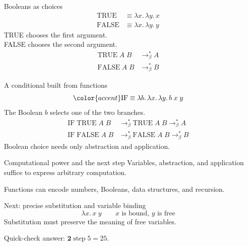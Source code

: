 \documentclass[aspectratio=169,11pt]{beamer}
\newcommand{\key}[1]{{\color{accent}#1}}
\begin{document}
\begin{frame}{Booleans as choices}
\begin{align*}
\mathrm{TRUE}&\equiv\lambda x.\,\lambda y.\,x\\[3mm]
\mathrm{FALSE}&\equiv\lambda x.\,\lambda y.\,y
\end{align*}
TRUE chooses the first argument.\\[2mm]
FALSE chooses the second argument.
\vspace{3mm}
\begin{align*}
\mathrm{TRUE}\;A\;B&\longrightarrow_{\beta}^{*}A\\
\mathrm{FALSE}\;A\;B&\longrightarrow_{\beta}^{*}B
\end{align*}
\end{frame}

\begin{frame}{A conditional built from functions}
\[\key{\mathrm{IF}\equiv\lambda b.\,\lambda x.\,\lambda y.\,b\;x\;y}\]
The Boolean $b$ selects one of the two branches.
\begin{align*}
\mathrm{IF}\;\mathrm{TRUE}\;A\;B
&\longrightarrow_{\beta}^{*}\mathrm{TRUE}\;A\;B
\longrightarrow_{\beta}^{*}A\\[4mm]
\mathrm{IF}\;\mathrm{FALSE}\;A\;B
&\longrightarrow_{\beta}^{*}\mathrm{FALSE}\;A\;B
\longrightarrow_{\beta}^{*}B
\end{align*}
\vspace{4mm}
Boolean choice needs only abstraction and application.
\end{frame}

\begin{frame}{Computational power and the next step}
Variables, abstraction, and application suffice to express arbitrary computation.
\vspace{4mm}

Functions can encode numbers, Booleans, data structures, and recursion.
\vspace{5mm}

\key{Next: precise substitution and variable binding}
\[\lambda x.\,x\;y\qquad\text{$x$ is bound, $y$ is free}\]
{\small Substitution must preserve the meaning of free variables.}
\vspace{4mm}

{\small Quick-check answer: $\mathbf{2}\;\mathrm{step}\;5=25$.}
\end{frame}
\end{document}
